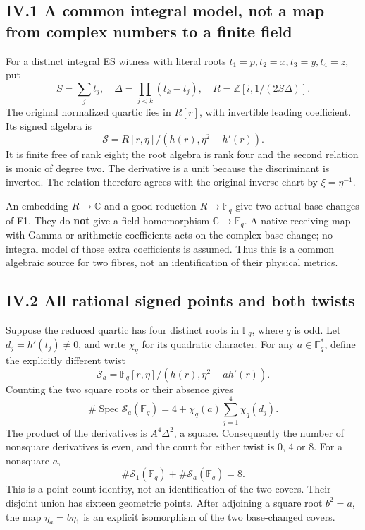 \subsection{IV.1 A common integral model, not a map from complex numbers
to a finite
field}\label{iv.1-a-common-integral-model-not-a-map-from-complex-numbers-to-a-finite-field}

For a distinct integral ES witness with literal roots
\(t_1=p,t_2=x,t_3=y,t_4=z\), put \[
S=\sum_jt_j,\quad \Delta=\prod_{j<k}(t_k-t_j),
\quad R=\mathbb Z[i,1/(2S\Delta)].
\] The original normalized quartic lies in \(R[r]\), with invertible
leading coefficient. Its signed algebra is \[
\mathscr S=R[r,\eta]/(h(r),\eta^2-h'(r)).
\tag{F1}
\] It is finite free of rank eight; the root algebra is rank four and
the second relation is monic of degree two. The derivative is a unit
because the discriminant is inverted. The relation therefore agrees with
the original inverse chart by \(\xi=\eta^{-1}\).

An embedding \(R\to\mathbb C\) and a good reduction \(R\to\mathbb F_q\)
give two actual base changes of F1. They do \textbf{not} give a field
homomorphism \(\mathbb C\to\mathbb F_q\). A native receiving map with
Gamma or arithmetic coefficients acts on the complex base change; no
integral model of those extra coefficients is assumed. Thus this is a
common algebraic source for two fibres, not an identification of their
physical metrics.

\subsection{IV.2 All rational signed points and both
twists}\label{iv.2-all-rational-signed-points-and-both-twists}

Suppose the reduced quartic has four distinct roots in \(\mathbb F_q\),
where \(q\) is odd. Let \(d_j=h'(t_j)\ne0\), and write \(\chi_q\) for
its quadratic character. For any \(a\in\mathbb F_q^*\), define the
explicitly different twist \[
\mathscr S_a=\mathbb F_q[r,\eta]/(h(r),\eta^2-a h'(r)).
\] Counting the two square roots or their absence gives \[
\boxed{\#\operatorname{Spec}\mathscr S_a(\mathbb F_q)
=4+\chi_q(a)\sum_{j=1}^4\chi_q(d_j).}
\tag{F2}
\] The product of the derivatives is \(A^4\Delta^2\), a square.
Consequently the number of nonsquare derivatives is even, and the count
for either twist is 0, 4 or 8. For a nonsquare \(a\), \[
\boxed{\#\mathscr S_1(\mathbb F_q)+\#\mathscr S_a(\mathbb F_q)=8.}
\tag{F3}
\] This is a point-count identity, not an identification of the two
covers. Their disjoint union has sixteen geometric points. After
adjoining a square root \(b^2=a\), the map \(\eta_a=b\eta_1\) is an
explicit isomorphism of the two base-changed covers.

